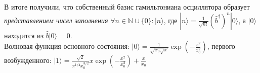 \documentclass[__main__.tex]{subfiles}
\begin{document}
В итоге получили, что собственный базис гамильтониана осциллятора образует \textit{представлением чисел заполнения} $\forall n\in\mathbb{N}\cup\{0\}\colon|n\rangle$, где $|n\rangle = \frac{1}{\sqrt{n!}}\left(\hat{b}^\dagger\right)^n|0\rangle$, а $|0\rangle$ находится из $\hat{b}|0\rangle = 0$.\\

Волновая функция основного состояния: $|0\rangle = \frac{1}{\sqrt{x_0\sqrt{\pi}}}\exp\left(-\frac{x^2}{x_0^2}\right)$, первого возбужденного: $|1\rangle = \frac{\sqrt{2}}{\pi^{1/4}x_0^{3/2}}x\exp\left(-\frac{x^2}{x_0^2}\right) + \frac{x}{x_0}$
\end{document}

